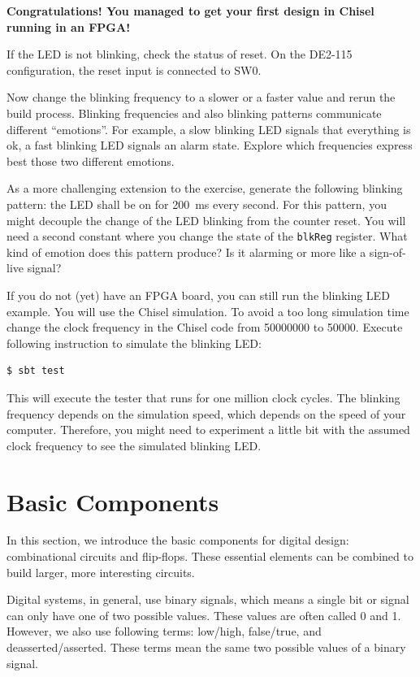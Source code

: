 \documentclass[%
    10pt,
    headinclude, footexclude,
    openright, %
    notitlepage,
    cleardoubleempty,
    headsepline,
    pointlessnumbers,
    bibtotoc, idxtotoc,
    ]{scrbook}
\newcommand{\code}[1]{{\small{\texttt{#1}}}}
\begin{document}
{\bf Congratulations! You managed to get your first design in Chisel running in an FPGA!}

If the LED is not blinking, check the status of reset. On the DE2-115 configuration,
the reset input is connected to SW0.

Now change the blinking frequency to a slower or a faster value and
rerun the build process. Blinking frequencies and also blinking patterns
communicate different ``emotions''. For example, a slow blinking LED signals that
everything is ok, a fast blinking LED signals an alarm state.
Explore which frequencies express best those two different emotions.

As a more challenging extension to the exercise, generate the following blinking pattern:
the LED shall be on for 200~ms every second. For this pattern, you might
decouple the change of the LED blinking from the counter reset.
You will need a second constant where you change the state of the
\code{blkReg} register. What kind of emotion does this pattern produce?
Is it alarming or more like a sign-of-live signal?

If you do not (yet) have an FPGA board, you can still run the blinking LED example.
You will use  the Chisel simulation. To avoid a too long simulation time change the
clock frequency in the Chisel code from 50000000 to 50000. Execute following
instruction to simulate the blinking LED:

\begin{verbatim}
$ sbt test
\end{verbatim}

This will execute the tester that runs for one million clock cycles.
The blinking frequency depends on the simulation speed, which depends on the
speed of your computer. Therefore, you might need to experiment a little bit
with the assumed clock frequency to see the simulated blinking LED.

\chapter{Basic Components}

In this section, we introduce the basic components for digital design:
combinational circuits and flip-flops.
These essential elements can be combined to build larger, more interesting circuits.

Digital systems, in general, use binary signals, which means a single bit or signal
can only have one of two possible values. These values are often called 0 and 1. However, we
also use following terms: low/high, false/true, and deasserted/asserted.
These terms mean the same two possible values of a binary signal.
\end{document}
